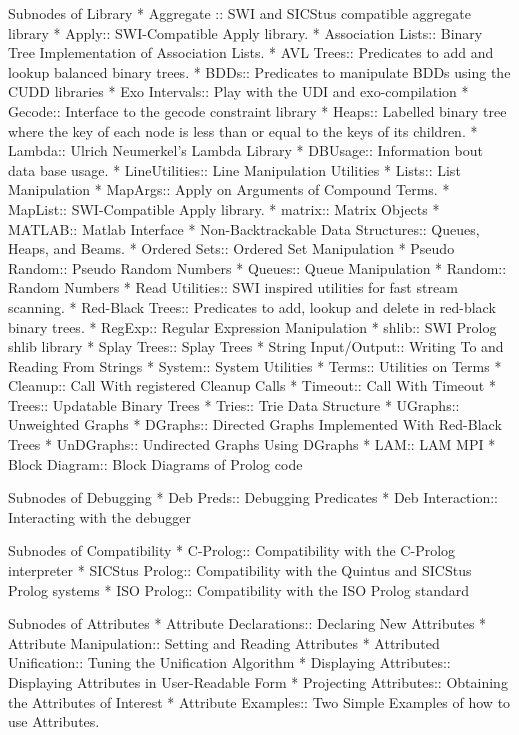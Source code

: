 Subnodes of Library
* Aggregate :: SWI and SICStus compatible aggregate library
* Apply:: SWI-Compatible Apply library.
* Association Lists:: Binary Tree Implementation of Association Lists.
* AVL Trees:: Predicates to add and lookup balanced binary  trees.
* BDDs:: Predicates to manipulate BDDs using the CUDD libraries
* Exo Intervals:: Play with the UDI and exo-compilation
* Gecode:: Interface to the gecode constraint library
* Heaps:: Labelled binary tree where the key of each node is less
    than or equal to the keys of its children.
* Lambda:: Ulrich Neumerkel's Lambda Library
* DBUsage:: Information bout data base usage.
* LineUtilities:: Line Manipulation Utilities
* Lists:: List Manipulation
* MapArgs:: Apply on Arguments of Compound Terms.
* MapList:: SWI-Compatible Apply library.
* matrix:: Matrix Objects
* MATLAB:: Matlab Interface
* Non-Backtrackable Data Structures:: Queues, Heaps, and Beams.
* Ordered Sets:: Ordered Set Manipulation
* Pseudo Random:: Pseudo Random Numbers
* Queues:: Queue Manipulation
* Random:: Random Numbers
* Read Utilities:: SWI inspired utilities for fast stream scanning.
* Red-Black Trees:: Predicates to add, lookup and delete in red-black binary  trees.
* RegExp:: Regular Expression Manipulation
* shlib:: SWI Prolog shlib library
* Splay Trees:: Splay Trees
* String Input/Output:: Writing To and Reading From Strings
* System:: System Utilities
* Terms:: Utilities on Terms
* Cleanup:: Call With registered Cleanup Calls
* Timeout:: Call With Timeout
* Trees:: Updatable Binary Trees
* Tries:: Trie Data Structure
* UGraphs:: Unweighted Graphs
* DGraphs:: Directed Graphs Implemented With Red-Black Trees
* UnDGraphs:: Undirected Graphs Using DGraphs
* LAM:: LAM MPI
* Block Diagram:: Block Diagrams of Prolog code


Subnodes of Debugging
* Deb Preds:: Debugging Predicates
* Deb Interaction:: Interacting with the debugger

Subnodes of Compatibility
* C-Prolog:: Compatibility with the C-Prolog interpreter
* SICStus Prolog:: Compatibility with the Quintus and SICStus Prolog systems
* ISO Prolog::  Compatibility with the ISO Prolog standard

Subnodes of Attributes
* Attribute Declarations:: Declaring New Attributes
* Attribute Manipulation:: Setting and Reading Attributes
* Attributed Unification:: Tuning the Unification Algorithm
* Displaying Attributes:: Displaying Attributes in User-Readable Form
* Projecting Attributes:: Obtaining the Attributes of Interest
* Attribute Examples:: Two Simple Examples of how to use Attributes.

